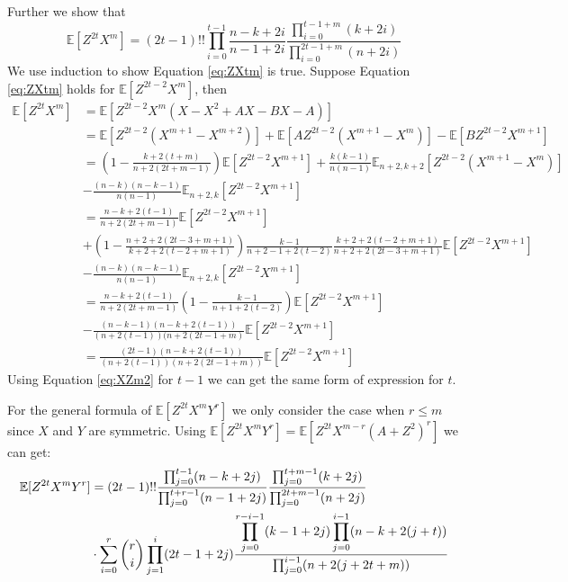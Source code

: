 \documentclass{article}
\def\E{\mathbb{E}}
\begin{document}
Further we show that
\begin{equation}\label{eq:ZXtm}
\E[Z^{2t} X^m] = (2t-1)!! \prod_{i=0}^{t-1}\frac{n-k+2i}{n-1+2i}
\frac{\prod_{i=0}^{t-1+m} (k+2i)}{\prod_{i=0}^{2t-1+m}(n+2i)}
\end{equation}
We use induction to show Equation \eqref{eq:ZXtm} is true.
Suppose Equation \eqref{eq:ZXtm} holds for $\E[Z^{2t-2}X^m]$, then
\begin{align*}
\E[Z^{2t}X^m] &= \E[Z^{2t-2}X^m(X-X^2+AX-BX-A)] \\
&= \E[Z^{2t-2}(X^{m+1} - X^{m+2})] +
\E[A Z^{2t-2} (X^{m+1} - X^m)] - \E[BZ^{2t-2} X^{m+1}] \\
&= \left(1-\frac{k+2(t+m)}{n+2(2t+m-1)}\right)\E[Z^{2t-2}X^{m+1}] +
\frac{k(k-1)}{n(n-1)}\E_{n+2,k+2}[Z^{2t-2}(X^{m+1} - X^m)] \\
&-\frac{(n-k)(n-k-1)}{n(n-1)}\E_{n+2,k}[Z^{2t-2}X^{m+1}]\\
&=\frac{n-k+2(t-1)}{n+2(2t+m-1)}\E[Z^{2t-2}X^{m+1}] \\
&+
\left(1-\frac{n+2+2(2t-3+m+1)}{k+2+2(t-2+m+1)}\right)
\frac{k-1}{n+2-1+2(t-2)}\frac{k+2+2(t-2+m+1)}{n+2+2(2t-3+m+1)}
\E[Z^{2t-2}X^{m+1}] \\
&-\frac{(n-k)(n-k-1)}{n(n-1)}\E_{n+2,k}[Z^{2t-2}X^{m+1}]\\
&=\frac{n-k+2(t-1)}{n+2(2t+m-1)}
\left(1-\frac{k-1}{n+1+2(t-2)}\right)\E[Z^{2t-2}X^{m+1}] \\
&-\frac{(n-k-1)(n-k+2(t-1))}{(n+2(t-1))(n+2(2t-1+m)}\E[Z^{2t-2}X^{m+1}] \\
&=\frac{(2t-1)(n-k+2(t-1))}{(n+2(t-1)) (n+2(2t-1+m))}\E[Z^{2t-2}X^{m+1}]
\end{align*}
Using Equation \eqref{eq:XZm2} for $t-1$
we can get the same form of expression for $t$.

For the general formula of $\E[Z^{2t}X^m Y^r]$
we only consider the case when $r\leq m$ since $X$ and $Y$ are symmetric.
Using $\E[Z^{2t}X^m Y^r]=\E[Z^{2t}X^{m-r}(A+Z^2)^r]$ we can get:
\begin{align}
\E[Z^{2t}X^m Y^r] &= (2t-1)!!
\frac{\prod_{j=0}^{t-1} (n-k+2j)}{\prod_{j=0}^{t+r-1} (n-1+2j)}
\frac{\prod_{j=0}^{t+m-1}(k+2j)}{\prod_{j=0}^{2t+m-1} (n+2j)}\notag\\
&\cdot\sum_{i=0}^r\binom{r}{i}\prod_{j=1}^i (2t-1+2j)
\frac{\displaystyle\prod_{j=0}^{r-i-1}(k-1+2j)
\prod_{j=0}^{i-1}(n-k+2(j+t))}{\prod_{j=0}^{i-1}(n+2(j+2t+m))}
\end{align}


\end{document}
